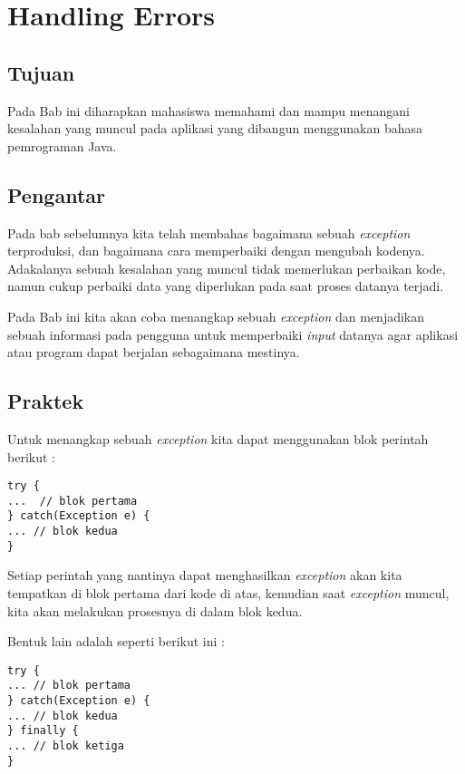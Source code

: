 \chapter{Handling Errors}

\section{Tujuan}

Pada Bab ini diharapkan mahasiswa memahami dan mampu menangani kesalahan yang muncul pada aplikasi yang dibangun menggunakan bahasa pemrograman Java.

\section{Pengantar}

Pada bab sebelumnya kita telah membahas bagaimana sebuah \textit{exception} terproduksi, dan bagaimana cara memperbaiki dengan mengubah kodenya. Adakalanya sebuah kesalahan yang muncul tidak memerlukan perbaikan kode, namun cukup perbaiki data yang diperlukan pada saat proses datanya terjadi.

Pada Bab ini kita akan coba menangkap sebuah \textit{exception} dan menjadikan sebuah informasi pada pengguna untuk memperbaiki \textit{input} datanya agar aplikasi atau program dapat berjalan sebagaimana mestinya.

\section{Praktek}

Untuk menangkap sebuah \textit{exception} kita dapat menggunakan blok perintah berikut :

\begin{lstlisting}
try {
...  // blok pertama
} catch(Exception e) {
... // blok kedua
}
\end{lstlisting}

Setiap perintah yang nantinya dapat menghasilkan \textit{exception} akan kita tempatkan di blok pertama dari kode di atas, kemudian saat \textit{exception} muncul, kita akan melakukan prosesnya di dalam blok kedua.

Bentuk lain adalah seperti berikut ini :

\begin{lstlisting}
try {
... // blok pertama
} catch(Exception e) {
... // blok kedua
} finally {
... // blok ketiga
}
\end{lstlisting}

